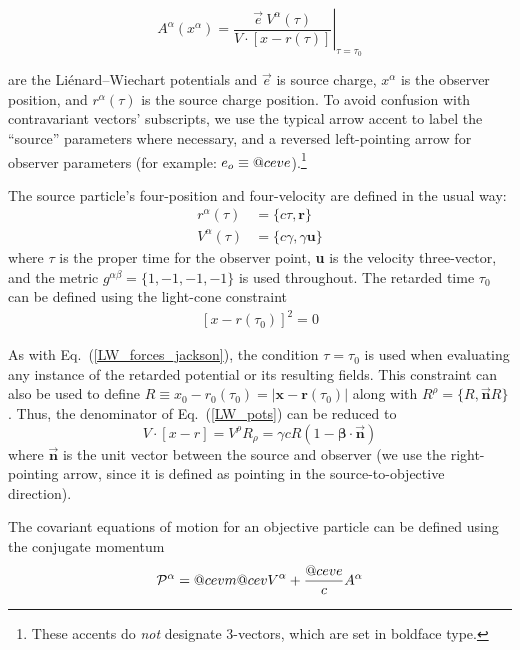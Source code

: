 \documentclass[reprint,
               amsmath,amssymb,nofootinbib, aps%
              ]{revtex4-2}
\makeatletter
\DeclareRobustCommand{\cev}[1]{%
  {\mathpalette\do@cev{#1}}%
}
\newcommand{\do@cev}[2]{%
  \vbox{\offinterlineskip
    \sbox\z@{$\m@th#1 x$}%
    \ialign{##\cr
      \hidewidth\reflectbox{$\m@th#1\vec{}\mkern4mu$}\hidewidth\cr
      \noalign{\kern-\ht\z@}
      $\m@th#1#2$\cr
    }%
  }%
}
\makeatother
\begin{document}
\begin{equation}
A^{\alpha}(x^\alpha)=\left.\frac{\vec{e}~V^{\alpha}(\tau)}{V \cdot[x-r(\tau)]}\right|_{\tau=\tau_{0}}
\label{LW_pots}
\end{equation}

\noindent are the Liénard--Wiechart potentials and $\vec{e}$ is source charge, $x^\alpha$ is the observer position, and $r^\alpha(\tau)$ is the source charge position. To avoid confusion with contravariant vectors' subscripts, we use the typical arrow accent to label the ``source'' parameters where necessary, and a reversed left-pointing arrow for observer parameters (for example: $e_o\equiv\cev{e}$).\footnote{These accents do \textit{not} designate 3-vectors, which are set in boldface type.}

The source particle's four-position and four-velocity are defined in the usual way:
\begin{align}
    r^\alpha(\tau) &= \{c\tau,\boldsymbol{r}\}
    \nonumber \\
    V^\alpha(\tau) &= \{c\gamma,\gamma\boldsymbol{u}\}
\end{align}
where $\tau$ is the proper time for the observer point, \textbf{u} is the velocity three-vector, and the metric $g^{\alpha \beta}=\{1, -1, -1, -1\}$ is used throughout. The retarded time $\tau_0$ can be defined using the light-cone constraint
\begin{align*}
    \left[x-r(\tau_0)\right]^2 = 0
\end{align*}

As with Eq.~(\ref{LW_forces_jackson}), the condition $\tau=\tau_0$ is used when evaluating any instance of the retarded potential or its resulting fields. This constraint can also be used to define $R\equiv x_0-r_0(\tau_0)=|\boldsymbol{x}-\boldsymbol{r}(\tau_0)|$ along with $R^\rho=\{R,\vec{\textbf{n}} R\}$. Thus, the denominator of Eq.~(\ref{LW_pots}) can be reduced to
\begin{equation}
    V\cdot [x-r] = V^\rho R_\rho =  \gamma c R(1-\boldsymbol{\beta}\cdot \vec{\textbf{n}})
\end{equation}
where $\vec{\textbf{n}}$ is the unit vector between the source and observer (we use the right-pointing arrow, since it is defined as pointing in the source-to-objective direction).

The covariant equations of motion for an objective particle can be defined using the conjugate momentum
\vspace{0.2cm}
\begin{equation}
    \mathcal{P}^\alpha = \cev{m} \cev{V}^\alpha + \frac{\cev{e}}{c}A^\alpha 
    \label{mom_conj}
\end{equation}
\end{document}
